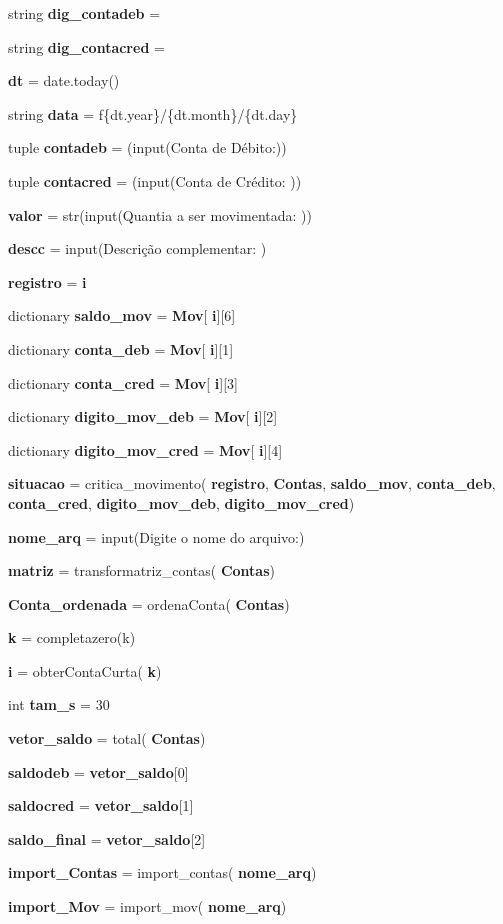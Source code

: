 \begin{DoxyCompactItemize}
\item 
string \textbf{ dig\+\_\+contadeb} = \textquotesingle{}\textquotesingle{}
\item 
string \textbf{ dig\+\_\+contacred} = \textquotesingle{}\textquotesingle{}
\item 
\textbf{ dt} = date.\+today()
\item 
string \textbf{ data} = f\textquotesingle{}\{dt.\+year\}/\{dt.\+month\}/\{dt.\+day\}\textquotesingle{}
\item 
tuple \textbf{ contadeb} = (input(\textquotesingle{}Conta de Débito\+:\textquotesingle{}))
\item 
tuple \textbf{ contacred} = (input(\textquotesingle{}Conta de Crédito\+: \textquotesingle{}))
\item 
\textbf{ valor} = str(input(\textquotesingle{}Quantia a ser movimentada\+: \textquotesingle{}))
\item 
\textbf{ descc} = input(\textquotesingle{}Descrição complementar\+: \textquotesingle{})
\item 
\textbf{ registro} = \textbf{ i}
\item 
dictionary \textbf{ saldo\+\_\+mov} = \textbf{ Mov}[\textbf{ i}][6]
\item 
dictionary \textbf{ conta\+\_\+deb} = \textbf{ Mov}[\textbf{ i}][1]
\item 
dictionary \textbf{ conta\+\_\+cred} = \textbf{ Mov}[\textbf{ i}][3]
\item 
dictionary \textbf{ digito\+\_\+mov\+\_\+deb} = \textbf{ Mov}[\textbf{ i}][2]
\item 
dictionary \textbf{ digito\+\_\+mov\+\_\+cred} = \textbf{ Mov}[\textbf{ i}][4]
\item 
\textbf{ situacao} = critica\+\_\+movimento(\textbf{ registro}, \textbf{ Contas}, \textbf{ saldo\+\_\+mov}, \textbf{ conta\+\_\+deb}, \textbf{ conta\+\_\+cred}, \textbf{ digito\+\_\+mov\+\_\+deb}, \textbf{ digito\+\_\+mov\+\_\+cred})
\item 
\textbf{ nome\+\_\+arq} = input(\textquotesingle{}Digite o nome do arquivo\+:\textquotesingle{})
\item 
\textbf{ matriz} = transformatriz\+\_\+contas(\textbf{ Contas})
\item 
\textbf{ Conta\+\_\+ordenada} = ordena\+Conta(\textbf{ Contas})
\item 
\textbf{ k} = completazero(k)
\item 
\textbf{ i} = obter\+Conta\+Curta(\textbf{ k})
\item 
int \textbf{ tam\+\_\+s} = 30
\item 
\textbf{ vetor\+\_\+saldo} = total(\textbf{ Contas})
\item 
\textbf{ saldodeb} = \textbf{ vetor\+\_\+saldo}[0]
\item 
\textbf{ saldocred} = \textbf{ vetor\+\_\+saldo}[1]
\item 
\textbf{ saldo\+\_\+final} = \textbf{ vetor\+\_\+saldo}[2]
\item 
\textbf{ import\+\_\+\+Contas} = import\+\_\+contas(\textbf{ nome\+\_\+arq})
\item 
\textbf{ import\+\_\+\+Mov} = import\+\_\+mov(\textbf{ nome\+\_\+arq})
\end{DoxyCompactItemize}


